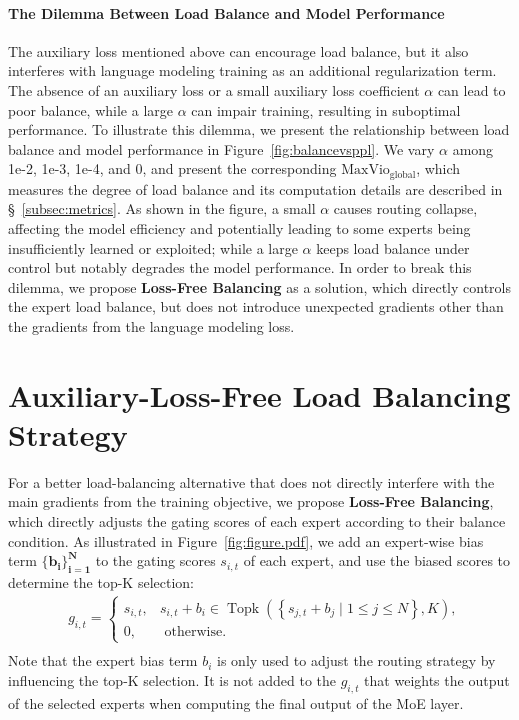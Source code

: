 \documentclass{article}
\newcommand{\ours}{Loss-Free Balancing}
\begin{document}
\paragraph{The Dilemma Between Load Balance and Model Performance}
\label{par:dilemma_balance_performance}
The auxiliary loss mentioned above can encourage load balance, but it also interferes with language modeling training as an additional regularization term. The absence of an auxiliary loss or a small auxiliary loss coefficient $\alpha$ can lead to poor balance, while a large $\alpha$ can impair training, resulting in suboptimal performance. 
To illustrate this dilemma, we present the relationship between load balance and model performance in Figure~\ref{fig:balancevsppl}. 
We vary $\alpha$ among 1e-2, 1e-3, 1e-4, and 0, and present the corresponding $\text{MaxVio}_\text{global}$, which measures the degree of load balance and its computation details are described in \S~\ref{subsec:metrics}.
As shown in the figure, a small $\alpha$ causes routing collapse, affecting the model efficiency and potentially leading to some experts being insufficiently learned or exploited; while a large $\alpha$ keeps load balance under control but notably degrades the model performance. 
In order to break this dilemma, we propose \textbf{\ours{}} as a solution, which directly controls the expert load balance, but does not introduce unexpected gradients other than the gradients from the language modeling loss. 

\section{Auxiliary-Loss-Free Load Balancing Strategy}
\label{sec:FBC-Gate}

For a better load-balancing alternative that does not directly interfere with the main gradients from the training objective, we propose \textbf{\ours{}}, which directly adjusts the gating scores of each expert according to their balance condition. 
As illustrated in Figure~\ref{fig:figure.pdf}, we add an expert-wise bias term $\boldsymbol{\{b_i\}_{i=1}^N}$ to the gating scores $s_{i,t}$ of each expert, and use the biased scores to determine the top-K selection:
\begin{equation}
\label{eq:PID_gate}
\begin{aligned}
& g_{i, t}= \begin{cases}s_{i, t}, & s_{i, t} + b_i \in \operatorname{Topk}\left(\left\{s_{j, t} + b_j\mid 1 \leq j \leq N\right\}, K\right), \\
0, & \text { otherwise. }\end{cases} \\
\end{aligned} 
\end{equation}
Note that the expert bias term $b_i$ is only used to adjust the routing strategy by influencing the top-K selection. 
It is not added to the $g_{i,t}$ that weights the output of the selected experts when computing the final output of the MoE layer.
\end{document}
